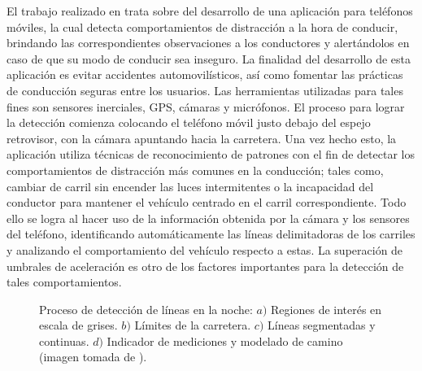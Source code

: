 El trabajo realizado en \cite{6856461} trata sobre del desarrollo de una aplicación para teléfonos móviles, la cual detecta comportamientos de distracción a la hora de conducir, brindando las correspondientes observaciones a los conductores y alertándolos en caso de que su modo de conducir sea inseguro. 
La finalidad del desarrollo de esta aplicación es evitar accidentes automovilísticos, así como fomentar las prácticas de conducción seguras entre los usuarios. 
Las herramientas utilizadas para tales fines son sensores inerciales, GPS, cámaras y micrófonos. 
El proceso para lograr la detección comienza colocando el teléfono móvil justo debajo del espejo retrovisor, con la cámara apuntando hacia la carretera. 
Una vez hecho esto, la aplicación utiliza técnicas de reconocimiento de patrones con el fin de detectar los comportamientos de distracción más comunes en la conducción; tales como, cambiar de carril sin encender las luces intermitentes o la incapacidad del conductor para mantener el vehículo centrado en el carril correspondiente. 
Todo ello se logra al hacer uso de la información obtenida por la cámara y los sensores del teléfono, identificando automáticamente las líneas delimitadoras de los carriles y analizando el comportamiento del vehículo respecto a estas. 
La superación de umbrales de aceleración es otro de los factores importantes para la detección de tales comportamientos.

\begin{figure}[H]
\centering
{}
\caption{Proceso de detección de líneas en la noche: $a)$ Regiones de interés en escala de grises. $b)$ Límites de la carretera. $c)$ Líneas segmentadas y continuas. $d)$ Indicador de mediciones y modelado de camino (imagen tomada de \cite{6856461}).}
\label{12(2)}
\end{figure}

